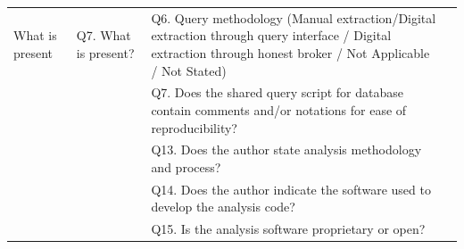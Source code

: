\documentclass[12pt, a4paper, twocolumn]{article}
\begin{document}
\begin{table}[]
\begin{tabular}{>{\raggedright\arraybackslash}p{}>{\raggedright\arraybackslash}p{} >{\raggedright\arraybackslash}p{}>{\raggedright\arraybackslash}p{}}
What is present &Q7. What is present?          &Q6. Query methodology (Manual extraction/Digital extraction through query interface / Digital extraction through honest broker / Not Applicable / Not Stated)  &\\
&&Q7. Does the shared query script for database contain comments and/or notations for ease of reproducibility?&\\
&& Q13. Does the author state analysis methodology and process?                                 & \\
&& Q14. Does the author indicate the software used to develop the analysis code? & \\
&& Q15. Is the analysis software proprietary or open? & \\ 

\hline

	\end{tabular}
	\end{table}
\end{document}
